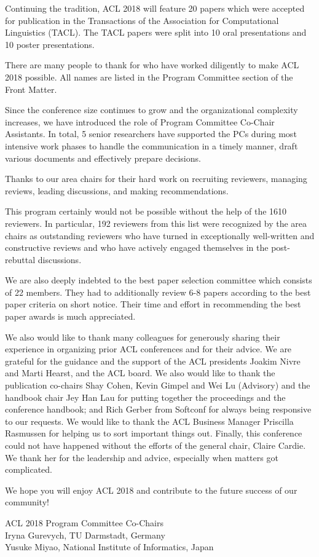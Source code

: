 Continuing the tradition, ACL 2018 will feature 20 papers
which were accepted for publication in the Transactions of the
Association for Computational Linguistics (TACL). The TACL papers
were split into 10 oral presentations and 10 poster presentations.

There are many people to thank for who have worked diligently to
make ACL 2018 possible. All names are listed in the Program Committee section of the Front
Matter. 

Since the conference size continues to grow and the organizational complexity increases, we have introduced the role of Program Committee Co-Chair Assistants. In total, 5 senior researchers have supported the PCs during most intensive work phases to handle the communication in a timely manner, draft various documents and effectively prepare decisions.

Thanks to our area chairs for their hard work on recruiting reviewers, managing reviews,
leading discussions, and making recommendations.  

This program certainly would not be possible without the help of
the 1610 reviewers.
In particular, 192 reviewers from this list were recognized
by the area chairs as outstanding reviewers who have turned in exceptionally
well-written and constructive reviews and who have actively engaged themselves in
the post-rebuttal discussions. 

We are also deeply indebted to the best paper selection committee which consists
of 22 members. They had to additionally review 6-8 papers according to the best paper criteria on short notice. Their time and effort in recommending the best paper awards is much appreciated.

We also would like to thank many colleagues for generously sharing their experience in
organizing prior ACL conferences and for their advice. We are
grateful for the guidance and the support of the ACL presidents
Joakim Nivre and Marti Hearst, and the ACL board. We also would like to thank
the publication co-chairs Shay Cohen, Kevin Gimpel and Wei Lu (Advisory) and the handbook chair Jey Han Lau for putting
together the proceedings and the conference handbook; and Rich Gerber from Softconf for always being responsive to our
requests. We would like to thank the ACL Business Manager Priscilla Rasmussen for helping us to sort important things out. 
Finally, this conference could not have happened without the efforts
of the general chair, Claire Cardie. We thank her for the leadership and advice, especially when matters got complicated.

We hope you will enjoy ACL 2018 and contribute to the future success of our community!


\vspace{1.0em}
\noindent ACL 2018 Program Committee Co-Chairs \\
Iryna Gurevych, TU Darmstadt, Germany \\
Yusuke Miyao, National Institute of Informatics, Japan
